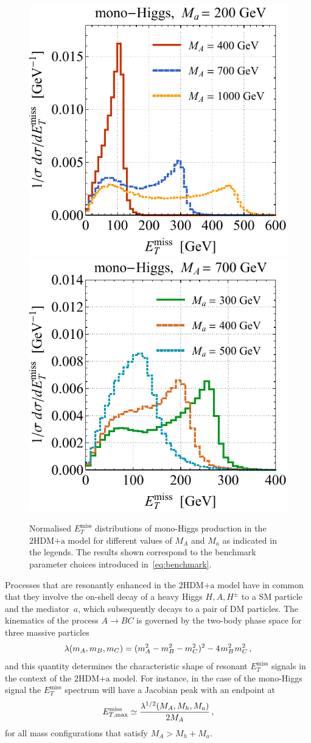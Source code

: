 \documentclass[a4paper, 11pt,notoc]{article}
\newcommand{\MET}{\ensuremath{E_T^\mathrm{miss}}\xspace}
\newcommand{\mA}{\ensuremath{M_{A}}\xspace}
\newcommand{\ma}{\ensuremath{M_{a}}\xspace}
\newcommand{\hdma}{\ensuremath{\textrm{2HDM+a}}\xspace}
\begin{document}
\begin{figure}[t!]
\centering
\includegraphics[height=0.45\textwidth]{hmetspecl.pdf}	\qquad 
\includegraphics[height=0.45\textwidth]{hmetspecr.pdf}
\vspace{2mm}
\caption{\label{fig:hMET} Normalised $\MET$ distributions of mono-Higgs production in the \hdma model for different values of $\mA$ and $\ma$ as indicated in the legends. The  results shown correspond to the benchmark parameter choices introduced in~\eqref{eq:benchmark}. }  
\end{figure}

Processes that are resonantly enhanced in the \hdma model have in common that they involve the on-shell decay of a heavy Higgs $H,A,H^\pm$ to a SM particle and the mediator~$a$, which    subsequently decays to a pair of DM particles. The kinematics of the process $A \to B C$ is governed by the two-body phase space for three massive particles 
\begin{equation} \label{eq:twophasespace}
\lambda(m_A, m_B, m_C) = (m_A^2 -m_B^2-m_C^2)^2 -  4 \hspace{0.25mm} m_B^2 \hspace{0.25mm}  m_C^2 \,,
\end{equation}
and this quantity determines the characteristic shape of resonant $\MET$ signals in the context of the \hdma model. For instance, in the case of the mono-Higgs signal the $\MET$ spectrum  will have a Jacobian peak with an endpoint at~\cite{No:2015xqa,Bauer:2017ota}
\begin{equation} \label{eq:monoHMETpeak}
E^{\rm{miss}}_{T, {\rm max} } \simeq \frac{\lambda^{1/2}(M_A, M_h, M_a)}{2 M_A}\,, 
\end{equation}
for all mass configurations that satisfy $M_A > M_h + M_a$. 
\end{document}
